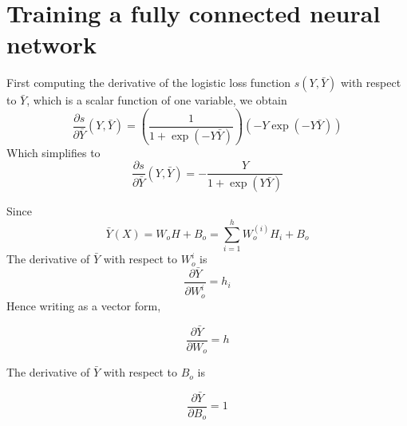 \documentclass{article}
\newcommand{\pd}[2]{\frac{\partial #1}{\partial #2}}
\begin{document}
\maketitle


\section{Training a fully connected neural network}



First computing the derivative of the logistic loss function
$s(Y, \bar{Y})$ with respect to $\bar{Y}$, which is a scalar function
of one variable, we obtain
\begin{equation*}
  \pd{s}{\bar{Y}}(Y, \bar{Y}) =
  \left(\dfrac{1}{1 + \exp{(-Y \bar{Y})}} \right)
  \left( -Y \exp{(-Y \bar{Y})} \right)
\end{equation*}
Which simplifies to
\begin{equation*}
  \pd{s}{\bar{Y}}(Y, \bar{Y}) =
  -\dfrac{Y}{1 + \exp{(Y \bar{Y})}}
\end{equation*}

Since
\begin{equation}
  \tag{$\star$}
  \label{eq:y-sum}
  \bar{Y}(X) = W_o H + B_o = \sum_{i = 1}^h W_o^{(i)} H_i + B_o
\end{equation}
The derivative of $\bar{Y}$ with respect to $W_o^{i}$ is
\begin{equation*}
  \pd{\bar{Y}}{W_o^{i}} = h_i
\end{equation*}
Hence writing as a vector form,
\begin{framed}
\begin{equation*}
  \pd{\bar{Y}}{W_o} = h
\end{equation*}
\end{framed}
The derivative of $\bar{Y}$ with respect to $B_o$ is
\begin{framed}
\begin{equation*}
  \pd{\bar{Y}}{B_o} = 1
\end{equation*}
\end{framed}
\end{document}
